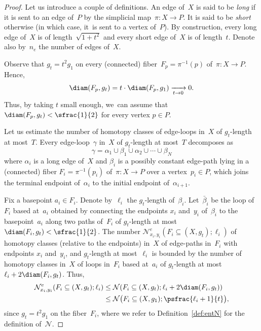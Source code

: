 \begin{proof}
Let us introduce a couple of definitions.
An edge of~$X$ is said to be \emph{long} if it is sent to an edge of~$P$ by the simplicial map~$\pi:X \to P$.
It is said to be \emph{short} otherwise (in which case, it~is sent to a vertex of~$P$).
By construction, every long edge of~$X$ is of length~$\sqrt{1+t^2}$ and every short edge of~$X$ is of length~$t$.
Denote also by~$n_e$ the number of edges of~$X$.

Observe that $g_t = t^2 g_1$ on every (connected) fiber~$F_p=\pi^{-1}(p)$ of~$\pi:X \to P$.
Hence,\vspace*{-3pt}
\[
\diam(F_p,g_t) = t \cdot \diam(F_p,g_1) \xrightarrow[t \to 0]{} 0.
\]
Thus, by taking $t$ small enough, we~can assume that $\diam(F_p,g_t) < \sfrac{1}{2}$ for every vertex $p \in P$.

Let us estimate the number of homotopy classes of edge-loops in~$X$ of \mbox{$g_t$-length} at most~$T$.
Every edge-loop~$\gamma$ in~$X$ of $g_t$-length at most~$T$ decomposes as\vspace*{-3pt}
\begin{equation} \label{eq:decomp}
\gamma = \alpha_1 \cup \beta_1 \cup \alpha_2 \cup \cdots \cup \beta_N
\end{equation}
where $\alpha_i$ is a long edge of~$X$ and $\beta_i$ is a possibly constant edge-path lying in a (connected) fiber $F_i=\pi^{-1}(p_i)$ of~$\pi:X \to P$ over a vertex~$p_i \in P$, which joins the terminal endpoint of~$\alpha_i$ to the initial endpoint of~$\alpha_{i+1}$.

Fix a basepoint $a_i \in F_i$.
Denote by~$\ell_i$ the $g_t$-length of~$\beta_i$.
Let~$\bar{\beta}_i$ be the loop of~$F_i$ based at~$a_i$ obtained by connecting the endpoints $x_i$ and~$y_i$ of~$\beta_i$ to the basepoint~$a_i$ along two paths of~$F_i$ of $g_t$-length at most $\diam(F_i,g_t) < \sfrac{1}{2}$.
The number \hbox{$\mathcal{N}^e_{{x_i},{y_i}}(F_i \subseteq (X,g_t);\ell_i)$} of homotopy classes (relative to the endpoints) in~$X$ of edge-paths in~$F_i$ with endpoints $x_i$ and~$y_i$, and $g_t$-length at most~$\ell_i$ is bounded by the number of homotopy classes in~$X$ of loops in~$F_i$ based at~$a_i$ of $g_t$-length at most $\ell_i + 2 \diam(F_i,g_t)$.
Thus,\vspace*{-2pt}
\begin{equation}\label{eq:N1}
\begin{aligned}
\mathcal{N}^e_{{x_i},{y_i}}(F_i \subseteq (X,g_t);\ell_i) & \leq \mathcal{N}(F_i \subseteq (X,g_t); \ell_i + 2 \diam(F_i,g_t))\\
& \leq \mathcal{N} \bigl(F_i \subseteq (X,g_1); \psfrac{\ell_i + 1}{t} \bigr),
\end{aligned}
\end{equation}
since $g_t = t^2 g_1$ on the fiber~$F_i$, where we refer to Definition~\ref{def:entN} for the definition of~$\mathcal{N}$.


\end{proof}
